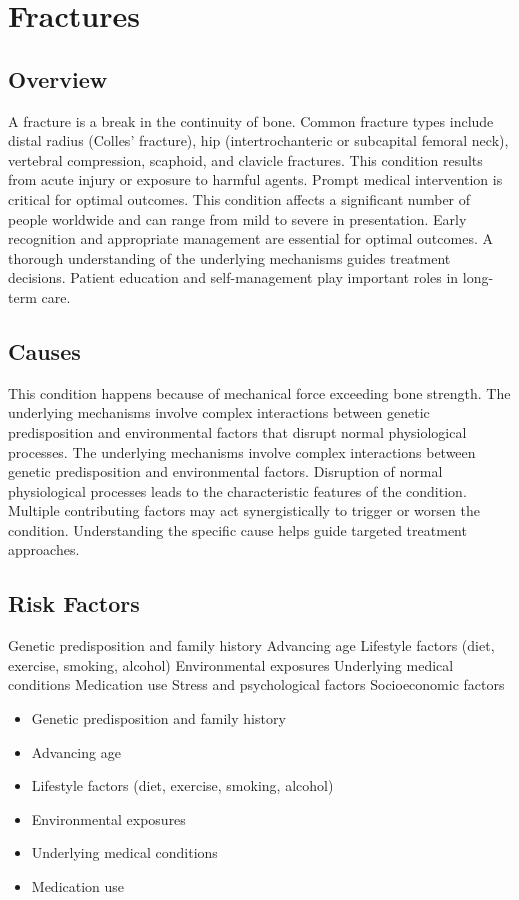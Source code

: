 \chapter{Fractures}
\label{sec:Fractures}

\section{Overview}
A fracture is a break in the continuity of bone. Common fracture types include distal radius (Colles' fracture), hip (intertrochanteric or subcapital femoral neck), vertebral compression, scaphoid, and clavicle fractures. This condition results from acute injury or exposure to harmful agents. Prompt medical intervention is critical for optimal outcomes. This condition affects a significant number of people worldwide and can range from mild to severe in presentation. Early recognition and appropriate management are essential for optimal outcomes. A thorough understanding of the underlying mechanisms guides treatment decisions. Patient education and self-management play important roles in long-term care.
\section{Causes}
This condition happens because of mechanical force exceeding bone strength. The underlying mechanisms involve complex interactions between genetic predisposition and environmental factors that disrupt normal physiological processes. The underlying mechanisms involve complex interactions between genetic predisposition and environmental factors. Disruption of normal physiological processes leads to the characteristic features of the condition. Multiple contributing factors may act synergistically to trigger or worsen the condition. Understanding the specific cause helps guide targeted treatment approaches.
\section{Risk Factors}
Genetic predisposition and family history Advancing age Lifestyle factors (diet, exercise, smoking, alcohol) Environmental exposures Underlying medical conditions Medication use Stress and psychological factors Socioeconomic factors

\begin{itemize}[noitemsep]
  \item Genetic predisposition and family history
  \item Advancing age
  \item Lifestyle factors (diet, exercise, smoking, alcohol)
  \item Environmental exposures
  \item Underlying medical conditions
  \item Medication use
\end{itemize}
